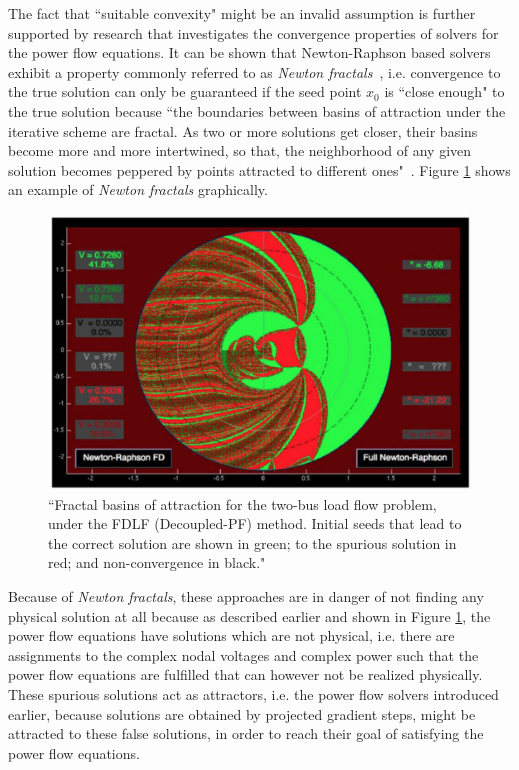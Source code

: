 \documentclass[11pt]{cmuthesis} %
\begin{document}
\begin{description}
The fact that ``suitable convexity" might be an invalid assumption is further supported by research that investigates the convergence properties of solvers for the power flow equations. It can be shown that Newton-Raphson based solvers exhibit a property commonly referred to as \emph{Newton fractals}~\cite{klump2000new,thorp1997load}, i.e. convergence to the true solution can only be guaranteed if the seed point $x_0$ is ``close enough" to the true solution because ``the boundaries between basins of attraction under the iterative scheme are fractal. As two or more solutions get closer, their basins become more and more intertwined, so that, the neighborhood of any given solution becomes peppered by points attracted to different ones"~\cite{trias2012holomorphic}. Figure \ref{fig:fractals} shows an example of \emph{Newton fractals} graphically.\\

\begin{figure}
\includegraphics[width=\linewidth]{fractals.png}
\caption[Fractal basins of attraction for the two-bus load flow problem, under
the FDLF (Decoupled-PF) method.]{``Fractal basins of attraction for the two-bus load flow problem, under
the FDLF (Decoupled-PF) method. Initial seeds that lead to the correct solution are shown in
green; to the spurious solution in red; and non-convergence in black."~\cite{trias2012holomorphic}}
\label{fig:fractals}
\end{figure}

Because of \emph{Newton fractals}, these approaches are in danger of not finding any physical solution at all because as described earlier and shown in Figure \ref{fig:fractals}, the power flow equations have solutions which are not physical, i.e. there are assignments to the complex nodal voltages and complex power such that the power flow equations are fulfilled that can however not be realized physically. These spurious solutions act as attractors, i.e. the power flow solvers introduced earlier, because solutions are obtained by projected gradient steps, might be attracted to these false solutions, in order to reach their goal of satisfying the power flow equations.\\


\end{description}
\end{document}
